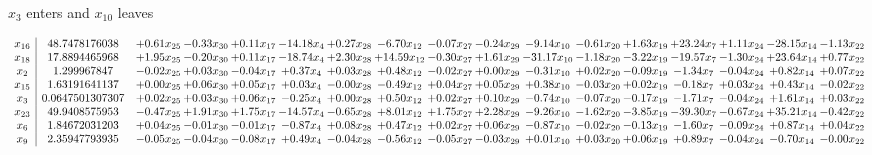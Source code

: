 \documentclass[9pt]{article}
\begin{document}
 $ x_{3} $ enters and $ x_{10} $ leaves 

 \[\begin{array}{c| c c@{\hskip 2pt} c@{\hskip 2pt} c@{\hskip 2pt} c@{\hskip 2pt} c@{\hskip 2pt} c@{\hskip 2pt} c@{\hskip 2pt} c@{\hskip 2pt} c@{\hskip 2pt} c@{\hskip 2pt} c@{\hskip 2pt} c@{\hskip 2pt} c@{\hskip 2pt} c@{\hskip 2pt} c@{\hskip 2pt} }
 x_{16}   &  48.7478176038 & +  0.61 x_{25} & -0.33 x_{30} & +  0.11 x_{17} & -14.18 x_{4} & +  0.27 x_{28} & -6.70 x_{12} & -0.07 x_{27} & -0.24 x_{29} & -9.14 x_{10} & -0.61 x_{20} & +  1.63 x_{19} & + 23.24 x_{7} & +  1.11 x_{24} & -28.15 x_{14} & -1.13 x_{22}\\
 x_{18}   &  17.8894465968 & +  1.95 x_{25} & -0.20 x_{30} & +  0.11 x_{17} & -18.74 x_{4} & +  2.30 x_{28} & + 14.59 x_{12} & -0.30 x_{27} & +  1.61 x_{29} & -31.17 x_{10} & -1.18 x_{20} & -3.22 x_{19} & -19.57 x_{7} & -1.30 x_{24} & + 23.64 x_{14} & +  0.77 x_{22}\\
 x_{2}   &  1.299967847 & -0.02 x_{25} & +  0.03 x_{30} & -0.04 x_{17} & +  0.37 x_{4} & +  0.03 x_{28} & +  0.48 x_{12} & -0.02 x_{27} & +  0.00 x_{29} & -0.31 x_{10} & +  0.02 x_{20} & -0.09 x_{19} & -1.34 x_{7} & -0.04 x_{24} & +  0.82 x_{14} & +  0.07 x_{22}\\
 x_{15}   &  1.63191641137 & +  0.00 x_{25} & +  0.06 x_{30} & +  0.05 x_{17} & +  0.03 x_{4} & -0.00 x_{28} & -0.49 x_{12} & +  0.04 x_{27} & +  0.05 x_{29} & +  0.38 x_{10} & -0.03 x_{20} & +  0.02 x_{19} & -0.18 x_{7} & +  0.03 x_{24} & +  0.43 x_{14} & -0.02 x_{22}\\
 x_{3}   &  0.0647501307307 & +  0.02 x_{25} & +  0.03 x_{30} & +  0.06 x_{17} & -0.25 x_{4} & +  0.00 x_{28} & +  0.50 x_{12} & +  0.02 x_{27} & +  0.10 x_{29} & -0.74 x_{10} & -0.07 x_{20} & -0.17 x_{19} & -1.71 x_{7} & -0.04 x_{24} & +  1.61 x_{14} & +  0.03 x_{22}\\
 x_{23}   &  49.9408575953 & -0.47 x_{25} & +  1.91 x_{30} & +  1.75 x_{17} & -14.57 x_{4} & -0.65 x_{28} & +  8.01 x_{12} & +  1.75 x_{27} & +  2.28 x_{29} & -9.26 x_{10} & -1.62 x_{20} & -3.85 x_{19} & -39.30 x_{7} & -0.67 x_{24} & + 35.21 x_{14} & -0.42 x_{22}\\
 x_{6}   &  1.84672031203 & +  0.04 x_{25} & -0.01 x_{30} & -0.01 x_{17} & -0.87 x_{4} & +  0.08 x_{28} & +  0.47 x_{12} & +  0.02 x_{27} & +  0.06 x_{29} & -0.87 x_{10} & -0.02 x_{20} & -0.13 x_{19} & -1.60 x_{7} & -0.09 x_{24} & +  0.87 x_{14} & +  0.04 x_{22}\\
 x_{9}   &  2.35947793935 & -0.05 x_{25} & -0.04 x_{30} & -0.08 x_{17} & +  0.49 x_{4} & -0.04 x_{28} & -0.56 x_{12} & -0.05 x_{27} & -0.03 x_{29} & +  0.01 x_{10} & +  0.03 x_{20} & +  0.06 x_{19} & +  0.89 x_{7} & -0.04 x_{24} & -0.70 x_{14} & -0.00 x_{22}\\

\end{array}\]
\end{document}

